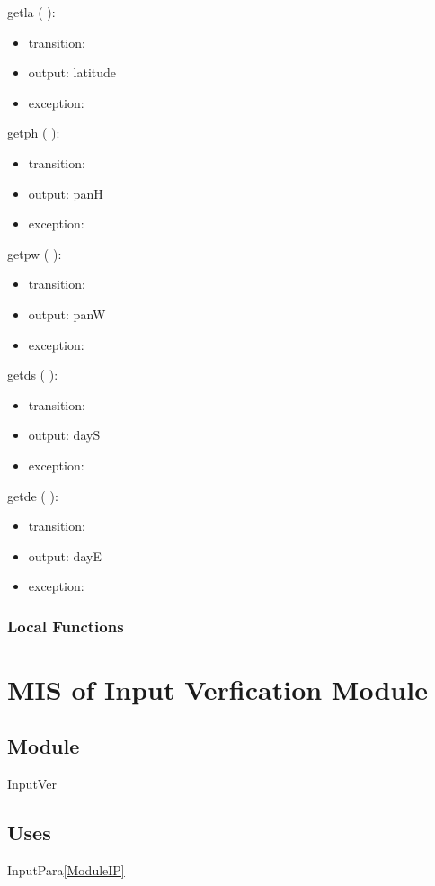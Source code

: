 \documentclass[12pt, titlepage]{article}
\begin{document}
\noindent  getla ( ):
\begin{itemize}
\item transition: 
\item output: latitude
\item exception: 
\end{itemize}

\noindent  getph ( ):
\begin{itemize}
\item transition: 
\item output: panH
\item exception: 
\end{itemize}

\noindent  getpw ( ):
\begin{itemize}
\item transition: 
\item output: panW
\item exception: 
\end{itemize}

\noindent  getds ( ):
\begin{itemize}
\item transition: 
\item output: dayS
\item exception: 
\end{itemize}

\noindent  getde ( ):
\begin{itemize}
\item transition: 
\item output: dayE
\item exception: 
\end{itemize}

\subsubsection{Local Functions}

\section{MIS of Input Verfication Module} \label{ModuleIV} 

\subsection{Module}
InputVer

\subsection{Uses}
InputPara\ref{ModuleIP}
\end{document}
